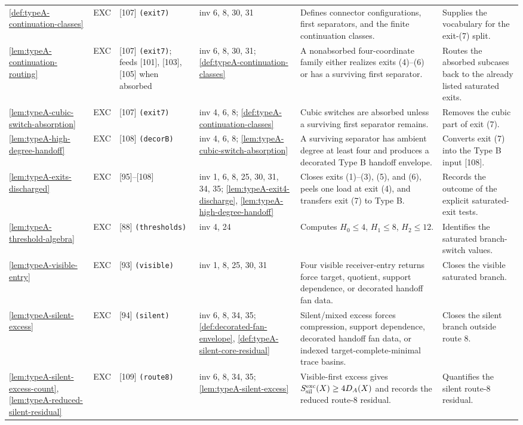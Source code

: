 \documentclass[11pt]{article}
\begin{document}
{\begin{longtable}{L{0.10\textwidth} C{0.045\textwidth} L{0.13\textwidth} L{0.135\textwidth} L{0.28\textwidth} L{0.20\textwidth}}
\cref{def:typeA-continuation-classes} & EXC & [107] \texttt{(exit7)} & inv 6, 8, 30, 31 & Defines connector configurations, first separators, and the finite continuation classes. & Supplies the vocabulary for the exit-(7) split. \\
\cref{lem:typeA-continuation-routing} & EXC & [107] \texttt{(exit7)}; feeds [101], [103], [105] when absorbed & inv 6, 8, 30, 31; \cref{def:typeA-continuation-classes} & A nonabsorbed four-coordinate family either realizes exits (4)--(6) or has a surviving first separator. & Routes the absorbed subcases back to the already listed saturated exits. \\
\cref{lem:typeA-cubic-switch-absorption} & EXC & [107] \texttt{(exit7)} & inv 4, 6, 8; \cref{def:typeA-continuation-classes} & Cubic switches are absorbed unless a surviving first separator remains. & Removes the cubic part of exit (7). \\
\cref{lem:typeA-high-degree-handoff} & EXC & [108] \texttt{(decorB)} & inv 4, 6, 8; \cref{lem:typeA-cubic-switch-absorption} & A surviving separator has ambient degree at least four and produces a decorated Type B handoff envelope. & Converts exit (7) into the Type B input [108]. \\
\cref{lem:typeA-exits-discharged} & EXC & [95]--[108] & inv 1, 6, 8, 25, 30, 31, 34, 35; \cref{lem:typeA-exit4-discharge}, \cref{lem:typeA-high-degree-handoff} & Closes exits (1)--(3), (5), and (6), peels one load at exit (4), and transfers exit (7) to Type B. & Records the outcome of the explicit saturated-exit tests. \\
\cref{lem:typeA-threshold-algebra} & EXC & [88] \texttt{(thresholds)} & inv 4, 24 & Computes $H_0\le4$, $H_1\le8$, $H_2\le12$. & Identifies the saturated branch-switch values. \\
\cref{lem:typeA-visible-entry} & EXC & [93] \texttt{(visible)} & inv 1, 8, 25, 30, 31 & Four visible receiver-entry returns force target, quotient, support dependence, or decorated handoff fan data. & Closes the visible saturated branch. \\
\cref{lem:typeA-silent-excess} & EXC & [94] \texttt{(silent)} & inv 6, 8, 34, 35; \cref{def:decorated-fan-envelope}, \cref{def:typeA-silent-core-residual} & Silent/mixed excess forces compression, support dependence, decorated handoff fan data, or indexed target-complete-minimal trace basins. & Closes the silent branch outside route 8. \\
\cref{lem:typeA-silent-excess-count}, \cref{lem:typeA-reduced-silent-residual} & EXC & [109] \texttt{(route8)} & inv 6, 8, 34, 35; \cref{lem:typeA-silent-excess} & Visible-first excess gives \(S_{\rm sil}^{\rm exc}(X)\ge4D_A(X)\) and records the reduced route-8 residual. & Quantifies the silent route-8 residual. \\

\end{longtable}}
\end{document}
